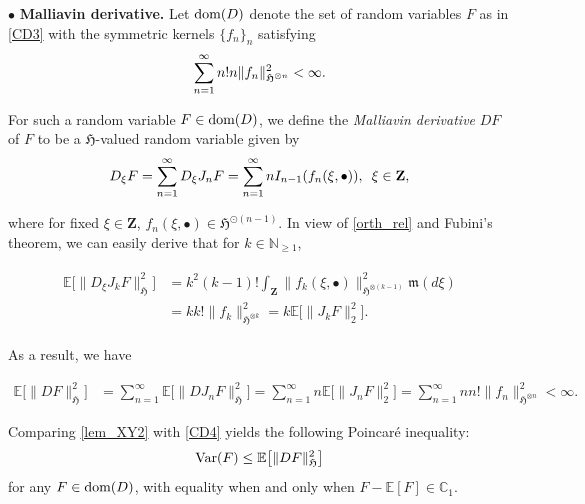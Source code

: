 \documentclass[letterpaper, 11pt,  reqno]{amsart}
\newcommand{\noi}{\noindent}
\newcommand{\C}{\mathbb{C}}
\newcommand{\bul}{\bullet}
\newcommand{\E}{\mathbb{E}}
\newcommand{\N}{\mathbb{N}}
\newcommand{\fm}{\mathfrak{m}}
\newcommand{\fH}{\mathfrak{H}}
\newcommand{\dom}{\textup{dom}}
\numberwithin{equation}{section}
\numberwithin{theorem}{section}
\begin{document}
\smallskip


\noi
$\bul$ {\bf Malliavin derivative.} Let $\dom(D)$ denote  the set of random variables
$F$ as in \eqref{CD3} with the  symmetric kernels $\{f_n\}_n$ satisfying
\begin{align}
\sum_{n=1}^\infty n! n \| f_n\|^2_{\fH^{\otimes n}} < \infty.
\notag %
\end{align}

\noi
For such a random variable $F\in\dom(D)$, we define the {\em Malliavin derivative}
$DF$ of $F$ to be a $\fH$-valued random variable  given by
\begin{align} \notag %
D_\xi F = \sum_{n=1}^\infty D_\xi J_n F    
= \sum_{n=1}^\infty n I_{n-1}(f_n(\xi, \bul) ), \,\, \, \xi\in \mathbf{Z},
\end{align}

\noi
where for fixed $\xi\in \mathbf{Z}$, $f_n(\xi, \bul)\in\fH^{\odot (n-1)}$. 
In view of \eqref{orth_rel} and Fubini's theorem, 
we can easily derive that for $k\in\N_{\geq 1}$,

\noi
\begin{align} \label{lem_XY}
\begin{aligned} 
\E\big[ \|D_\xi J_k F \|^2_\fH \big]
&=   k^2 (k-1)!  \int_{\mathbf{Z}} \|f_k(\xi, \bul)\|^2_{\fH^{\otimes (k-1)}}\fm(d\xi) \\
&= k k! \| f_k\|^2_{\fH^{\otimes k}} = k   \E\big[ \| J_k F \|^2_2  \big].  
\end{aligned}
\end{align}

\noi
As a result, we have 

\noi
\begin{align}  \label{lem_XY2}
\E\big[ \| DF \|_{\fH}^2  \big] 
 &=  \sum_{n=1}^\infty  \E\big[ \| DJ_n F \|_{\fH}^2  \big]  =  \sum_{n=1}^\infty  n \E\big[ \| J_n F \|^2_2  \big]  
= \sum_{n=1}^\infty n n!  \| f_n\|^2_{\fH^{\otimes n}} <\infty.
\end{align}
 
 \noi
Comparing \eqref{lem_XY2} with \eqref{CD4} yields
the following Poincar\'e inequality: %
\begin{align}
{\rm Var}(F) \leq \E\big[ \| DF \|_{\fH}^2  \big]
\label{Poi1}
\end{align}
for any $F\in\dom(D)$,
with equality when and only when $F - \E[F] \in \C_1$.  



 
\smallskip
\end{document}
